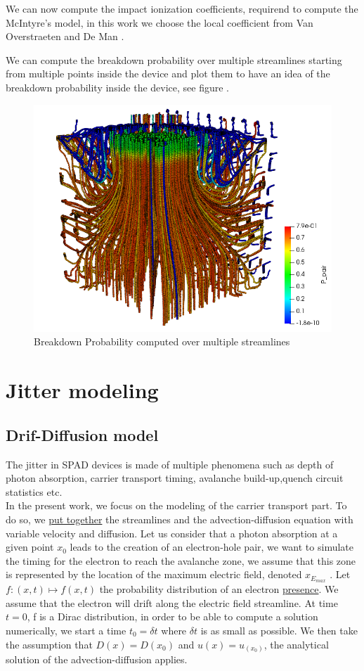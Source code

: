 \documentclass[10pt,a4paper,twocolumn]{article}
\begin{document}
We can now compute the impact ionization coefficients, requirend to compute the McIntyre's model, in this work we choose the local coefficient from Van Overstraeten and De Man \cite{van_overstraeten_measurement_1970}.

We can compute the breakdown probability over multiple streamlines starting from multiple points inside the device and plot them to have an idea of the breakdown probability inside the device, see figure .

\begin{figure}[hbtp]
\caption{Breakdown Probability computed over multiple streamlines}
\centering
\includegraphics[scale=0.50]{../pictures/MultipleStreamlinesBrP.png}
\end{figure}


\section{Jitter modeling}
\subsection{Drif-Diffusion model}
The jitter in SPAD devices is made of multiple phenomena such as depth of photon absorption, carrier transport timing, avalanche build-up,quench circuit statistics etc. \\In the present work, we focus on the modeling of the carrier transport part. To do so, we \underline{put together} the streamlines and the advection-diffusion equation with variable velocity and diffusion.
Let us consider that a photon absorption at a given point $x_0$ leads to the creation of an electron-hole pair, we want to simulate the timing for the electron to reach the avalanche zone, we assume that this zone is represented by the location of the maximum electric field, denoted $x_{E_{max}}$ . Let $f : (x,t) \mapsto f(x,t)$ the probability distribution of an electron \underline{presence}. We assume that the electron will drift along the electric field streamline. At time $t=0$, f is a Dirac distribution, in order to be able to compute a solution numerically, we start a time $t_0 = \delta t$ where $\delta t$ is as small as possible. We then take the assumption that $D(x) = D(x_0)$ and $u(x) = u_(x_0)$, the analytical solution of the advection-diffusion applies. 
\end{document}
